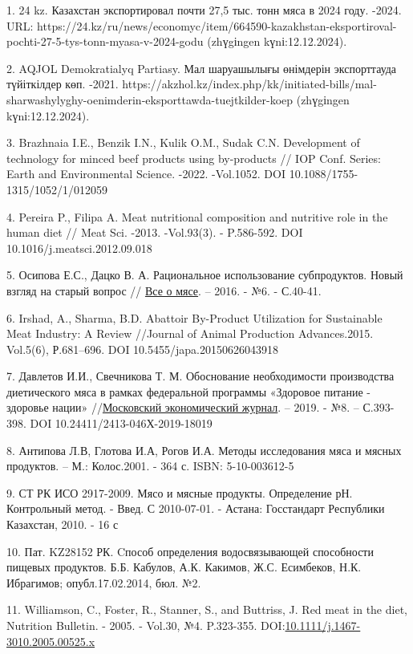 \begin{references}
1. 24 kz. Казахстан экспортировал почти 27,5 тыс. тонн мяса в 2024 году.
-2024.
URL:
https://24.kz/ru/news/economyc/item/664590-kazakhstan-eksportiroval-pochti-27-5-tys-tonn-myasa-v-2024-godu
(zhүgіngen kүnі:12.12.2024).

2. AQJOL Demokratialyq Partiasy. Мал шаруашылығы өнімдерін экспорттауда
түйіткілдер көп. -2021.
https://akzhol.kz/index.php/kk/initiated-bills/mal-sharwashylyghy-oenimderin-eksporttawda-tuejtkilder-koep
(zhүgіngen kүnі:12.12.2024).

3. Brazhnaia I.E., Benzik I.N., Kulik O.M., Sudak C.N. Development of
technology for minced beef products using by-products // IOP Conf.
Series: Earth and Environmental Science. -2022. -Vol.1052. DOI
10.1088/1755-1315/1052/1/012059

4. Pereira P., Filipa A. Meat nutritional composition and nutritive role
in the human diet // Meat Sci. -2013. -Vol.93(3). - P.586-592. DOI
10.1016/j.meatsci.2012.09.018

5. Осипова Е.С., Дацко В. А. Рациональное использование субпродуктов.
Новый взгляд на старый вопрос //
\href{https://cyberleninka.ru/journal/n/vse-o-myase}{Все о мясе}. --
2016. - №6. - С.40-41.

6. Irshad, A., Sharma, B.D. Abattoir By-Product Utilization for
Sustainable Meat Industry: A Review //Journal of Animal Production
Advances.2015. Vol.5(6), Р.681--696. DOI
10.5455/japa.20150626043918

7. Давлетов И.И., Свечникова Т. М. Обоснование необходимости производства
диетического мяса в рамках федеральной программы «Здоровое питание -
здоровье нации»
//\href{https://cyberleninka.ru/journal/n/moskovskiy-ekonomicheskiy-zhurnal}{Московский
экономический журнал}. -- 2019. - №8. -- С.393-398. DOI
10.24411/2413-046Х-2019-18019

8. Антипова Л.В, Глотова И.А, Рогов И.А. Методы исследования мяса и
мясных продуктов. -- М.: Колос.2001. - 364 с. ISBN: 5-10-003612-5

9. СТ РК ИСО 2917-2009. Мясо и мясные продукты. Определение рН.
Контрольный метод. - Введ. С 2010-07-01. - Астана: Госстандарт
Республики Казахстан, 2010. - 16 с

10. Пат. KZ28152 РК. Cпособ определения водосвязывающей способности
пищевых продуктов. Б.Б. Кабулов, А.К. Какимов, Ж.С. Есимбеков, Н.К.
Ибрагимов; опубл.17.02.2014, бюл. №2.

11. Williamson, C., Foster, R., Stanner, S., and Buttriss, J. Red meat in
the diet, Nutrition Bulletin. - 2005. - Vol.30, №4. P.323-355.
DOI:\href{http://dx.doi.org/10.1111/j.1467-3010.2005.00525.x}{10.1111/j.1467-3010.2005.00525.x}


\end{references}
